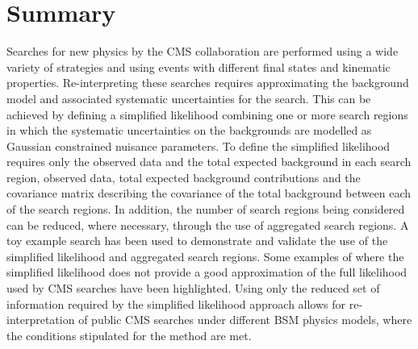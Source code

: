 \section{Summary}
\label{sec:conclusions}
Searches for new physics by the CMS collaboration are performed using a wide variety of 
strategies and using events with different final states and kinematic properties. 
Re-interpreting these searches requires approximating the background model
and associated systematic uncertainties for the search. This can be 
achieved by defining a simplified likelihood combining one or more search regions in which the systematic 
uncertainties on the backgrounds are modelled  as Gaussian  constrained nuisance parameters. 
To define the simplified likelihood requires only the observed data and the total expected background in each search region, observed data, 
total expected background contributions and the covariance matrix describing the covariance of the total background between each of the search regions. 
In addition, the number of search regions being considered can be reduced, where necessary, through the use of aggregated search regions. 
A toy example search has been used to demonstrate and validate the use of the simplified likelihood and aggregated search 
regions. Some examples of where the simplified likelihood does not provide a good approximation of the 
full likelihood used by CMS searches have been highlighted. Using only the reduced set of information required by the simplified likelihood 
approach allows for re-interpretation of public CMS searches under different BSM physics models, where the conditions stipulated for the 
method are met.

